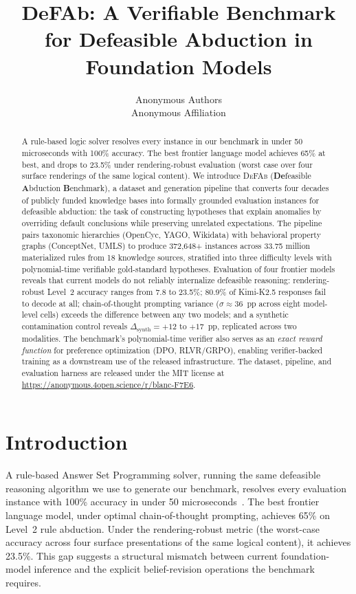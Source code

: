 \documentclass{article}
\title{DeFAb: A Verifiable Benchmark for Defeasible Abduction in Foundation Models}
\author{%
  Anonymous Authors \\
  Anonymous Affiliation \\
}
\theoremstyle{definition}
\begin{document}
\maketitle


\begin{abstract}
A rule-based logic solver resolves every instance in our benchmark in under 50 microseconds with 100\% accuracy. The best frontier language model achieves 65\% at best, and drops to 23.5\% under rendering-robust evaluation (worst case over four surface renderings of the same logical content). We introduce \textsc{DeFAb} (\textbf{De}feasible \textbf{A}bduction \textbf{B}enchmark), a dataset and generation pipeline that converts four decades of publicly funded knowledge bases into formally grounded evaluation instances for defeasible abduction: the task of constructing hypotheses that explain anomalies by overriding default conclusions while preserving unrelated expectations. The pipeline pairs taxonomic hierarchies (OpenCyc, YAGO, Wikidata) with behavioral property graphs (ConceptNet, UMLS) to produce 372,648+ instances across 33.75 million materialized rules from 18 knowledge sources, stratified into three difficulty levels with polynomial-time verifiable gold-standard hypotheses. Evaluation of four frontier models reveals that current models do not reliably internalize defeasible reasoning: rendering-robust Level~2 accuracy ranges from 7.8 to 23.5\%; 80.9\% of Kimi-K2.5 responses fail to decode at all; chain-of-thought prompting variance ($\sigma \approx 36$~pp across eight model-level cells) exceeds the difference between any two models; and a synthetic contamination control reveals $\Delta_{\mathrm{synth}} = +12$ to $+17$~pp, replicated across two modalities. The benchmark's polynomial-time verifier also serves as an \emph{exact reward function} for preference optimization (DPO, RLVR/GRPO), enabling verifier-backed training as a downstream use of the released infrastructure. The dataset, pipeline, and evaluation harness are released under the MIT license at \url{https://anonymous.4open.science/r/blanc-F7E6}.
\end{abstract}


\section{Introduction}\label{sec:intro}

A rule-based Answer Set Programming solver, running the same defeasible reasoning algorithm we use to generate our benchmark, resolves every evaluation instance with 100\% accuracy in under 50 microseconds~\citep{maher2001propositional}. The best frontier language model, under optimal chain-of-thought prompting, achieves 65\% on Level~2 rule abduction. Under the rendering-robust metric (the worst-case accuracy across four surface presentations of the same logical content), it achieves 23.5\%. This gap suggests a structural mismatch between current foundation-model inference and the explicit belief-revision operations the benchmark requires.
\end{document}

